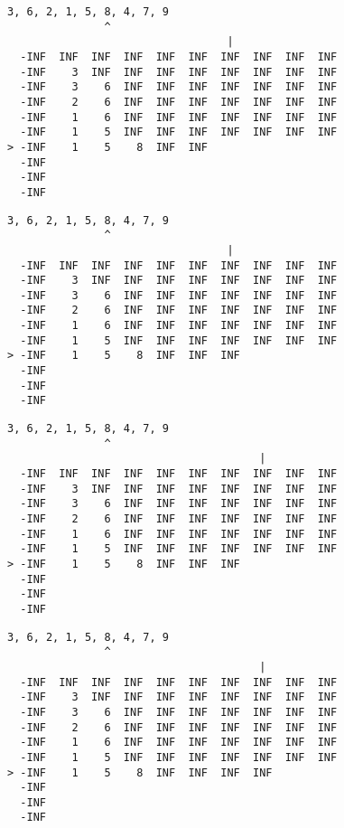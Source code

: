 { \begin{verbatim}
3, 6, 2, 1, 5, 8, 4, 7, 9
               ^
                                  |
  -INF  INF  INF  INF  INF  INF  INF  INF  INF  INF
  -INF    3  INF  INF  INF  INF  INF  INF  INF  INF
  -INF    3    6  INF  INF  INF  INF  INF  INF  INF
  -INF    2    6  INF  INF  INF  INF  INF  INF  INF
  -INF    1    6  INF  INF  INF  INF  INF  INF  INF
  -INF    1    5  INF  INF  INF  INF  INF  INF  INF
> -INF    1    5    8  INF  INF                    
  -INF                                             
  -INF                                             
  -INF                                             
\end{verbatim} }

{ \begin{verbatim}
3, 6, 2, 1, 5, 8, 4, 7, 9
               ^
                                  |
  -INF  INF  INF  INF  INF  INF  INF  INF  INF  INF
  -INF    3  INF  INF  INF  INF  INF  INF  INF  INF
  -INF    3    6  INF  INF  INF  INF  INF  INF  INF
  -INF    2    6  INF  INF  INF  INF  INF  INF  INF
  -INF    1    6  INF  INF  INF  INF  INF  INF  INF
  -INF    1    5  INF  INF  INF  INF  INF  INF  INF
> -INF    1    5    8  INF  INF  INF               
  -INF                                             
  -INF                                             
  -INF                                             
\end{verbatim} }

{ \begin{verbatim}
3, 6, 2, 1, 5, 8, 4, 7, 9
               ^
                                       |
  -INF  INF  INF  INF  INF  INF  INF  INF  INF  INF
  -INF    3  INF  INF  INF  INF  INF  INF  INF  INF
  -INF    3    6  INF  INF  INF  INF  INF  INF  INF
  -INF    2    6  INF  INF  INF  INF  INF  INF  INF
  -INF    1    6  INF  INF  INF  INF  INF  INF  INF
  -INF    1    5  INF  INF  INF  INF  INF  INF  INF
> -INF    1    5    8  INF  INF  INF               
  -INF                                             
  -INF                                             
  -INF                                             
\end{verbatim} }

{ \begin{verbatim}
3, 6, 2, 1, 5, 8, 4, 7, 9
               ^
                                       |
  -INF  INF  INF  INF  INF  INF  INF  INF  INF  INF
  -INF    3  INF  INF  INF  INF  INF  INF  INF  INF
  -INF    3    6  INF  INF  INF  INF  INF  INF  INF
  -INF    2    6  INF  INF  INF  INF  INF  INF  INF
  -INF    1    6  INF  INF  INF  INF  INF  INF  INF
  -INF    1    5  INF  INF  INF  INF  INF  INF  INF
> -INF    1    5    8  INF  INF  INF  INF          
  -INF                                             
  -INF                                             
  -INF                                             
\end{verbatim} }

